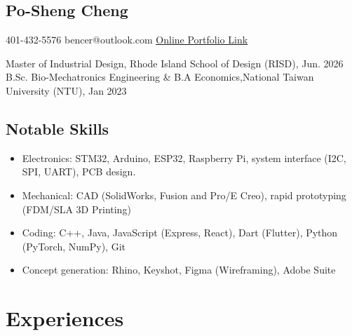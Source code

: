 \documentclass[12pt]{article}
\begin{document}
\begin{multicols}{2}
    \section*{Po-Sheng Cheng}
    401-432-5576 \newline
    bencer@outlook.com \newline
    \href{https://bencer3283.github.io/art/}{\underline{Online Portfolio Link}}
    
    \columnbreak
    {\sffamily \small \noindent
    Master of Industrial Design, Rhode Island School of Design (RISD), Jun. 2026 \newline \newline
    B.Sc. Bio-Mechatronics Engineering \& B.A Economics,\newline National Taiwan University (NTU), Jan 2023
    }
\end{multicols}
\subsection*{Notable Skills}
{ \small \begin{itemize}
    \item Electronics: STM32, Arduino, ESP32, Raspberry Pi, system interface (I2C, SPI, UART), PCB design.
    \item Mechanical: CAD (SolidWorks, Fusion and Pro/E Creo), rapid prototyping (FDM/SLA 3D Printing)
    \item Coding: C++, Java, JavaScript (Express, React), Dart (Flutter), Python (PyTorch, NumPy), Git
    \item Concept generation: Rhino, Keyshot, Figma (Wireframing), Adobe Suite
\end{itemize}}
    \section*{Experiences}
\end{document}
